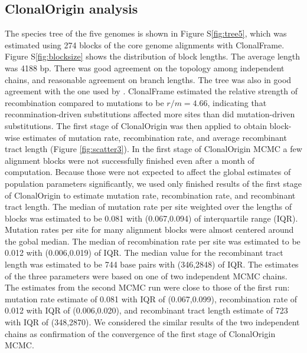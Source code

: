 \documentclass[english]{article}
\begin{document}
\subsection{ClonalOrigin analysis}
The species tree of the five genomes is shown in Figure S\ref{fig:tree5}, which
was estimated using 274 blocks of the core genome alignments with ClonalFrame. 
Figure S\ref{fig:blocksize} shows the distribution of block lengths. The average
length was 4188 bp.  There was good 
agreement on the topology among independent chains, and reasonable agreement on 
branch lengths. The tree was also in good agreement with the one used by 
\citet{Suzuki2011}. ClonalFrame estimated the relative strength of recombination
compared to mutations to be $r/m = 4.66$, indicating 
that reconmination-driven substitutions affected more 
sites than did mutation-driven substitutions. The first stage of ClonalOrigin 
was then applied to obtain block-wise estimates of mutation rate, 
recombination rate, and average recombinant tract length 
(Figure \ref{fig:scatter3}).
In the first stage of ClonalOrigin MCMC a few alignment blocks were not
successfully finished even after a month of computation. 
Because those were not expected
to affect the global estimates of population parameters significantly, we used
only finished results of the first stage of ClonalOrigin to estimate mutation
rate, recombination rate, and recombinant tract length. 
The median of mutation
rate per site weighted over the lengths of blocks was estimated to
be 0.081 with (0.067,0.094) of interquartile range (IQR). Mutation rates
per site for many alignment blocks were almost centered around the
gobal median. The median of recombination rate per site was estimated
to be 0.012 with (0.006,0.019) of IQR.
The median value for the recombinant tract length was estimated
to be 744 base pairs with (346,2848) of IQR. 
The estimates of the three parameters were based on one of two independent
MCMC chains. 
The estimates from the second MCMC run were close to those of
the first run: mutation rate estimate of 0.081 with IQR of (0.067,0.099),
recombination rate of 0.012 with IQR of (0.006,0.020), and recombinant tract
length estimate of 723 with IQR of (348,2870).
We considered the similar 
results of the two independent chains as confirmation of 
the convergence of the first stage of ClonalOrigin MCMC.

\end{document}
